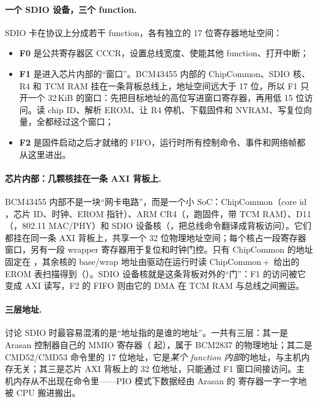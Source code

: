 \paragraph{一个 SDIO 设备，三个 function.} SDIO 卡在协议上分成若干 function，各有独立的 17 位寄存器地址空间：
\begin{itemize}
  \item \textbf{F0} 是公共寄存器区 CCCR，设置总线宽度、使能其他 function、打开中断；
  \item \textbf{F1} 是进入芯片内部的“窗口”。BCM43455 内部的 ChipCommon、SDIO 核、R4 和 TCM RAM 挂在一条背板总线上，地址空间远大于 17 位，所以 F1 只开一个 32\,KiB 的窗口：先把目标地址的高位写进窗口寄存器，再用低 15 位访问。读 chip ID、解析 EROM、让 R4 停机、下载固件和 NVRAM、写复位向量，全都经过这个窗口；
  \item \textbf{F2} 是固件启动之后才就绪的 FIFO，运行时所有控制命令、事件和网络帧都从这里进出。
\end{itemize}

\paragraph{芯片内部：几颗核挂在一条 AXI 背板上.} BCM43455 内部不是一块“网卡电路”，而是一个小 SoC：ChipCommon（core id ，芯片 ID、时钟、EROM 指针）、ARM CR4（，跑固件，带 TCM RAM）、D11（，802.11 MAC/PHY）和 SDIO 设备核（，把总线命令翻译成背板访问）。它们都挂在同一条 AXI 背板上，共享一个 32 位物理地址空间；每个核占一段寄存器窗口，另有一段 wrapper 寄存器用于复位和时钟门控。只有 ChipCommon 的地址固定在 ，其余核的 base/wrap 地址由驱动在运行时读 ChipCommon\,+\, 给出的 EROM 表扫描得到（）。SDIO 设备核就是这条背板对外的“门”：F1 的访问被它变成 AXI 读写，F2 的 FIFO 则由它的 DMA 在 TCM RAM 与总线之间搬运。

\paragraph{三层地址.} 讨论 SDIO 时最容易混淆的是“地址指的是谁的地址”。一共有三层：其一是 Arasan 控制器自己的 MMIO 寄存器（ 起），属于 BCM2837 的物理地址；其二是 CMD52/CMD53 命令里的 17 位地址，它是\emph{某个 function 内部}的地址，与主机内存无关；其三是芯片 AXI 背板上的 32 位地址，只能通过 F1 窗口间接访问。主机内存从不出现在命令里——PIO 模式下数据经由 Arasan 的  寄存器一字一字地被 CPU 搬进搬出。

